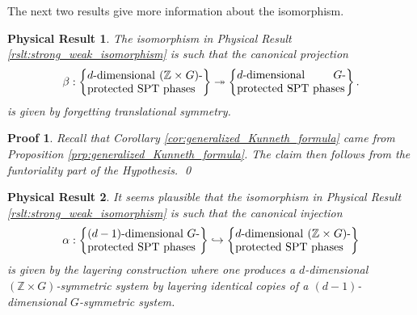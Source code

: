 \documentclass[sort&compress]{elsarticle}
\theoremstyle{theoremstyle}
\theoremstyle{framedtheoremstyle}
\newtheorem{rslt}{Physical Result}
\theoremstyle{definitionstyle}
\theoremstyle{definitionstyle}
\theoremstyle{definitionstyle}
\theoremstyle{definitionstyle}
\theoremstyle{nameddefinitionstyle}
\theoremstyle{framednameddefinitionstyle}
\theoremstyle{proofstyle}
\newtheorem{pf}{Proof}
\theoremstyle{definitionstyle}
\newcommand{\oneone}{\hookrightarrow}
\newcommand{\onto}{\twoheadrightarrow}
\newcommand{\ZZZ}{\mathbb{Z}}
\newcommand{\isomorphic}{\cong}
\newcommand{\paren}[1]{\left( #1 \right)}
\newcommand{\braces}[1]{\left\{ #1 \right\}}
\begin{document}

The next two results give more information about the isomorphism.

\begin{framed}\begin{rslt}
The isomorphism in Physical Result \ref{rslt:strong_weak_isomorphism} is such that the canonical projection
\begin{eqnarray}
\beta: \braces{\parbox{3.6cm}{$d$-dimensional $(\ZZZ \times G)$-protected SPT phases}}%
\onto
\braces{\parbox{3.4cm}{$d$-dimensional $G$-protected SPT phases}}.
\end{eqnarray}
is given by forgetting translational symmetry.\label{rslt:strong_weak_projection}
\end{rslt}\end{framed}

\begin{pf}
Recall that Corollary \ref{cor:generalized_Kunneth_formula} came from Proposition \ref{prp:generalized_Kunneth_formula}. The claim then follows from the funtoriality part of the Hypothesis.
\qed\end{pf}

\begin{framed}\begin{rslt}
It seems plausible that the isomorphism in Physical Result \ref{rslt:strong_weak_isomorphism} is such that the canonical injection
\begin{eqnarray}
\alpha:
\braces{\parbox{3.5cm}{$(d-1)$-dimensional $G$-protected SPT phases}}
\oneone
\braces{\parbox{3.6cm}{$d$-dimensional $(\ZZZ \times G)$-protected SPT phases}}
\end{eqnarray}
is given by the layering construction where one produces a $d$-dimensional $\paren{\ZZZ \times G}$-symmetric system by layering identical copies of a $(d-1)$-dimensional $G$-symmetric system.\label{rslt:strong_weak_injection}
\end{rslt}\end{framed}
\end{document}
